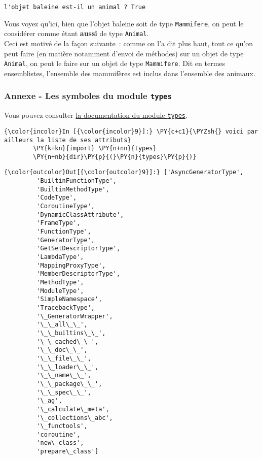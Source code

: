     \begin{Verbatim}[commandchars=\\\{\}]
l'objet baleine est-il un animal ? True

    \end{Verbatim}

    Vous voyez qu'ici, bien que l'objet baleine soit de type
\texttt{Mammifere}, on peut le considérer comme étant \textbf{aussi} de
type \texttt{Animal}.\\

Ceci est motivé de la façon suivante~: comme on l'a dit plus haut, tout
ce qu'on peut faire (en matière notamment d'envoi de méthodes) sur un
objet de type \texttt{Animal}, on peut le faire sur un objet de type
\texttt{Mammifere}. Dit en termes ensemblistes, l'ensemble des
mammifères est inclus dans l'ensemble des animaux.

    \hypertarget{annexe---les-symboles-du-module-types}{%
\subsubsection{\texorpdfstring{Annexe - Les symboles du module
\texttt{types}}{Annexe - Les symboles du module types}}\label{annexe---les-symboles-du-module-types}}

    Vous pouvez consulter
\href{https://docs.python.org/3/library/types.html}{la documentation du
module \texttt{types}}.

    \begin{Verbatim}[commandchars=\\\{\}]
{\color{incolor}In [{\color{incolor}9}]:} \PY{c+c1}{\PYZsh{} voici par ailleurs la liste de ses attributs}
        \PY{k+kn}{import} \PY{n+nn}{types} 
        \PY{n+nb}{dir}\PY{p}{(}\PY{n}{types}\PY{p}{)}
\end{Verbatim}


\begin{Verbatim}[commandchars=\\\{\}]
{\color{outcolor}Out[{\color{outcolor}9}]:} ['AsyncGeneratorType',
         'BuiltinFunctionType',
         'BuiltinMethodType',
         'CodeType',
         'CoroutineType',
         'DynamicClassAttribute',
         'FrameType',
         'FunctionType',
         'GeneratorType',
         'GetSetDescriptorType',
         'LambdaType',
         'MappingProxyType',
         'MemberDescriptorType',
         'MethodType',
         'ModuleType',
         'SimpleNamespace',
         'TracebackType',
         '\_GeneratorWrapper',
         '\_\_all\_\_',
         '\_\_builtins\_\_',
         '\_\_cached\_\_',
         '\_\_doc\_\_',
         '\_\_file\_\_',
         '\_\_loader\_\_',
         '\_\_name\_\_',
         '\_\_package\_\_',
         '\_\_spec\_\_',
         '\_ag',
         '\_calculate\_meta',
         '\_collections\_abc',
         '\_functools',
         'coroutine',
         'new\_class',
         'prepare\_class']
\end{Verbatim}